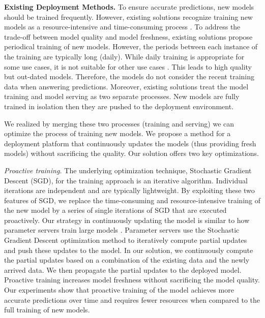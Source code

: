 \textbf{Existing Deployment Methods.} 
To ensure accurate predictions, new models should be trained frequently.
However, existing solutions recognize training new models as a resource-intensive and time-consuming process \cite{crankshaw2014missing, agarwal2014laser, baylor2017tfx}.
To address the trade-off between model quality and model freshness, existing solutions propose periodical training of new models.
However, the periods between each instance of the training are typically long (daily).
While daily training is appropriate for some use cases, it is not suitable for other use cases \cite{baylor2017tfx}.
This leads to high quality but out-dated models.
Therefore, the models do not consider the recent training data when answering predictions.
Moreover, existing solutions treat the model training and model serving as two separate processes. 
New models are fully trained in isolation then they are pushed to the deployment environment.

We realized by merging these two processes (training and serving) we can optimize the process of training new models.
We propose a method for a deployment platform that continuously updates the models (thus providing fresh models) without sacrificing the quality.
Our solution offers two key optimizations.

\textit{Proactive training.}
The underlying optimization technique, Stochastic Gradient Descent (SGD), for the training approach is an iterative algorithm.
Individual iterations are independent and are typically lightweight.
By exploiting these two features of SGD, we replace the time-consuming and resource-intensive training of the new model by a series of single iterations of SGD that are executed proactively.
Our strategy in continuously updating the model is similar to how parameter servers train large models \cite{li2014scaling}.
Parameter servers use the Stochastic Gradient Descent optimization method to iteratively compute partial updates and push these updates to the model.
In our solution, we continuously compute the partial updates based on a combination of the existing data and the newly arrived data.
We then propagate the partial updates to the deployed model.
Proactive training increases model freshness without sacrificing the model quality.
Our experiments show that proactive training of the model achieves more accurate predictions over time and requires fewer resources when compared to the full training of new models.

